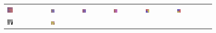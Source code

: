 \begin{figure}[h!]
\begin{tabular}{C{0.14\textwidth}C{0.14\textwidth}C{0.14\textwidth}C{0.14\textwidth}C{0.14\textwidth}C{0.14\textwidth}C{0.14\textwidth}}
		\includegraphics[width=0.14\textwidth]{images/gen/spatial_weight/p03_03.png_0.00.png} &
		\includegraphics[width=0.14\textwidth]{images/gen/spatial_weight/p03_03.png_0.33.png} &
		\includegraphics[width=0.14\textwidth]{images/gen/spatial_weight/p03_03.png_0.66.png} &
		\includegraphics[width=0.14\textwidth]{images/gen/spatial_weight/p03_03.png_1.00.png} &
		\includegraphics[width=0.14\textwidth]{images/gen/spatial_weight/p03_03.png_1.33.png} &
		\includegraphics[width=0.14\textwidth]{images/gen/spatial_weight/p03_03.png_1.66.png} \\
		\includegraphics[width=0.14\textwidth]{images/p03/p03_04.png} &
		\includegraphics[width=0.14\textwidth]{images/gen/spatial_weight/p03_04.png_0.00.png} &

\end{tabular}
\end{figure}
